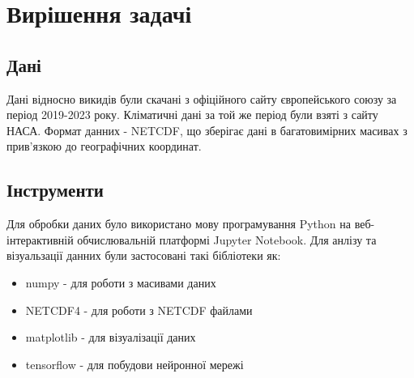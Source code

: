 \chapter{Вирішення задачі}

\section{Дані}

Дані відносно викидів були скачані з офіційного сайту європейського союзу за період 2019-2023 року.
Кліматичні дані за той же період були взяті з сайту НАСА. 
Формат данних - NETCDF, що зберігає дані в багатовимірних масивах з прив'язкою до географічних координат.


\section{Інструменти}

Для обробки даних було використано мову програмування Python на веб-інтерактивній обчислювальній платформі Jupyter Notebook. 
Для анлізу та візуальзації данних були застосовані такі бібліотеки як: 

\begin{itemize}
    \item numpy - для роботи з масивами даних
    \item NETCDF4 - для роботи з NETCDF файлами
    \item matplotlib - для візуалізації даних
    \item tensorflow - для побудови нейронної мережі
\end{itemize}


